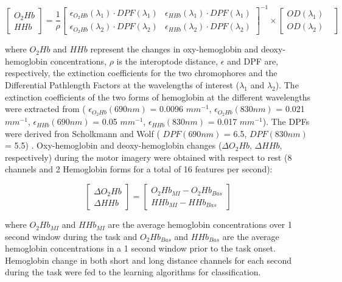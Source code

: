 \documentclass[12pt]{iopart}
\begin{document}
\begin{equation}
\begin{bmatrix}
O_2Hb\\
HHb
\end{bmatrix}
=
\frac{1}{\rho}\begin{bmatrix}
\epsilon_{O_2Hb}(\lambda_1)\cdot DPF(\lambda_1)&\epsilon_{HHb}(\lambda_1)\cdot DPF(\lambda_1)\\
\epsilon_{O_2Hb}(\lambda_2)\cdot DPF(\lambda_2)&\epsilon_{HHb}(\lambda_2)\cdot DPF(\lambda_2)
\end{bmatrix}^{-1}\times
\begin{bmatrix}
OD(\lambda_1)&\\
OD(\lambda_2)
\end{bmatrix}
\end{equation}

where $O_{2}Hb$ and $HHb$ represent the changes in oxy-hemoglobin and deoxy-hemoglobin concentrations, $\rho$ is the interoptode distance, $\epsilon$  and DPF are, respectively, the extinction coefficients for the two chromophores and the Differential Pathlength Factors at the wavelengths of interest ($\lambda _{1}$ and $\lambda _{2}$). The extinction coefficients of the two forms of hemoglobin at the different wavelengths  were extracted from \parencite{zijlstra1991absorption} ( $\epsilon_{O_{2}Hb}(690nm)$ = 0.0096 $mm^{-1}$, $\epsilon_{O_{2}Hb}(830nm)$ = 0.021 $mm^{-1}$, $\epsilon_{HHb}(690nm)$ = 0.05 $mm^{-1}$, $\epsilon_{HHb}(830nm)$ = 0.017 $mm^{-1}$).  The DPFs were derived fron Scholkmann and Wolf  ( $DPF(690nm)$ = 6.5, $DPF(830nm)$ = 5.5) \parencite{scholkmann2013general}.
Oxy-hemoglobin and deoxy-hemoglobin changes ($\Delta O_{2}Hb$, $\Delta HHb$, respectively) during the motor imagery were obtained  with respect to rest (8 channels and 2 Hemoglobin forms for a total of 16 features per second):

 \begin{equation}
\begin{bmatrix}
\Delta O_2Hb\\
\Delta HHb
\end{bmatrix}
=
\begin{bmatrix}
O_2Hb_{MI}-O_2Hb_{Bas}\\
HHb_{MI}-HHb_{Bas}
\end{bmatrix}
\end{equation}

where $O_{2}Hb_{MI}$ and $HHb_{MI}$ are the average hemoglobin concentrations over 1 second window during the task and $O_{2}Hb_{Bas}$ and $HHb_{Bas}$ are the average hemoglobin concentrations in a 1 second window prior to the task onset.
Hemoglobin change  in both short and long distance channels for each second during the task were fed to the learning algorithms for classification. 
\end{document}
